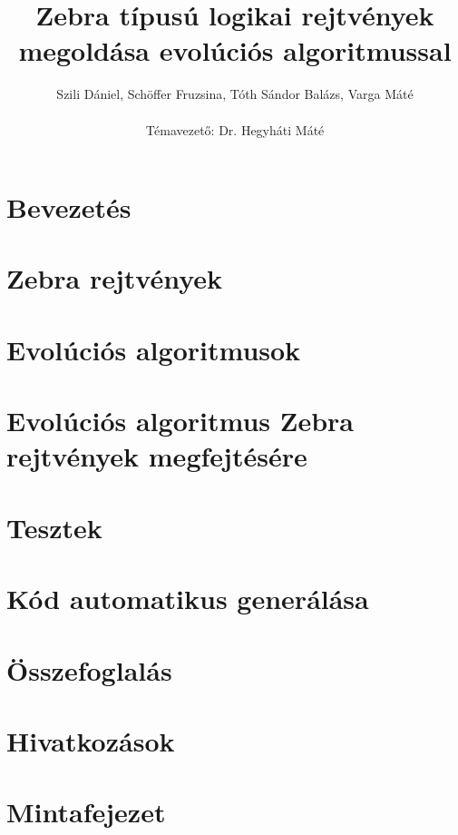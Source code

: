 \documentclass[12ppt,a4paper,oneside]{report}
\author{Szili Dániel, Schöffer Fruzsina, Tóth Sándor Balázs, Varga Máté\\\ \\Témavezető: Dr. Hegyháti Máté}
\title{Zebra típusú logikai rejtvények megoldása evolúciós algoritmussal}
\begin{document}
\maketitle

\tableofcontents

\chapter{Bevezetés}

\chapter{Zebra rejtvények}

\chapter{Evolúciós algoritmusok}

\chapter{Evolúciós algoritmus Zebra rejtvények megfejtésére}

\chapter{Tesztek}

\chapter{Kód automatikus generálása}

\chapter{Összefoglalás}

\chapter*{Hivatkozások}

\appendix

\chapter{Mintafejezet}
\end{document}
